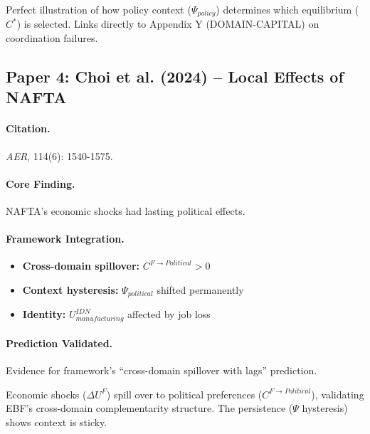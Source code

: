 \begin{tcolorbox}[colback=yellow!5!white, colframe=yellow!75!black,
    title=EBF Insight: Bank Runs]
Perfect illustration of how policy context ($\Psi_{policy}$) determines
which equilibrium ($C^*$) is selected. Links directly to Appendix Y
(DOMAIN-CAPITAL) on coordination failures.
\end{tcolorbox}


\subsection{Paper 4: Choi et al. (2024) -- Local Effects of NAFTA}

\paragraph{Citation.}
\emph{AER}, 114(6): 1540-1575.

\paragraph{Core Finding.}
NAFTA's economic shocks had lasting political effects.

\paragraph{Framework Integration.}
\begin{itemize}
  \item \textbf{Cross-domain spillover:} $C^{F \to Political} > 0$
  \item \textbf{Context hysteresis:} $\Psi_{political}$ shifted permanently
  \item \textbf{Identity:} $U^{IDN}_{manufacturing}$ affected by job loss
\end{itemize}

\paragraph{Prediction Validated.}
Evidence for framework's ``cross-domain spillover with lags'' prediction.

\begin{tcolorbox}[colback=yellow!5!white, colframe=yellow!75!black,
    title=EBF Insight: Trade and Politics]
Economic shocks ($\Delta U^F$) spill over to political preferences
($C^{F \to Political}$), validating EBF's cross-domain complementarity
structure. The persistence ($\Psi$ hysteresis) shows context is sticky.
\end{tcolorbox}


